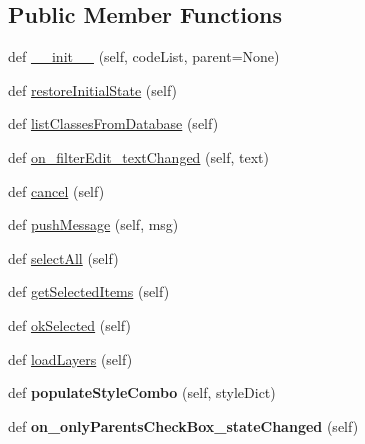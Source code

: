 \subsection*{Public Member Functions}
\begin{DoxyCompactItemize}
\item 
def \mbox{\hyperlink{class_dsg_tools_1_1_layer_tools_1_1load__by__class_1_1_load_by_class_ab9a30d1e698158414c0fd302f1db3ab7}{\+\_\+\+\_\+init\+\_\+\+\_\+}} (self, code\+List, parent=None)
\item 
def \mbox{\hyperlink{class_dsg_tools_1_1_layer_tools_1_1load__by__class_1_1_load_by_class_a2d4794f6c8dae759b5818bede495cc20}{restore\+Initial\+State}} (self)
\item 
def \mbox{\hyperlink{class_dsg_tools_1_1_layer_tools_1_1load__by__class_1_1_load_by_class_a1efa7341ff7e4a8cc6aa15d8e1ef9d9f}{list\+Classes\+From\+Database}} (self)
\item 
def \mbox{\hyperlink{class_dsg_tools_1_1_layer_tools_1_1load__by__class_1_1_load_by_class_a9668940bfcdd2e6083191f06e080b3fd}{on\+\_\+filter\+Edit\+\_\+text\+Changed}} (self, text)
\item 
def \mbox{\hyperlink{class_dsg_tools_1_1_layer_tools_1_1load__by__class_1_1_load_by_class_a9648d37e3fa7311e4cb454089d3b768a}{cancel}} (self)
\item 
def \mbox{\hyperlink{class_dsg_tools_1_1_layer_tools_1_1load__by__class_1_1_load_by_class_ab876bb3ea266ff3dfbedc5d4109c5d39}{push\+Message}} (self, msg)
\item 
def \mbox{\hyperlink{class_dsg_tools_1_1_layer_tools_1_1load__by__class_1_1_load_by_class_a6d48fb9212088fb024f0de2b056f50c7}{select\+All}} (self)
\item 
def \mbox{\hyperlink{class_dsg_tools_1_1_layer_tools_1_1load__by__class_1_1_load_by_class_ad0fcaa51e682f1cf9fbbef4f1e2ac8e3}{get\+Selected\+Items}} (self)
\item 
def \mbox{\hyperlink{class_dsg_tools_1_1_layer_tools_1_1load__by__class_1_1_load_by_class_adc722a26fb632875f143b4dbf6544d36}{ok\+Selected}} (self)
\item 
def \mbox{\hyperlink{class_dsg_tools_1_1_layer_tools_1_1load__by__class_1_1_load_by_class_a1b632f61531a5ba993286a11b1b99345}{load\+Layers}} (self)
\item 
\mbox{\label{class_dsg_tools_1_1_layer_tools_1_1load__by__class_1_1_load_by_class_a875ea5636754b1428f478d8685c5794b}} 
def {\bfseries populate\+Style\+Combo} (self, style\+Dict)
\item 
\mbox{\label{class_dsg_tools_1_1_layer_tools_1_1load__by__class_1_1_load_by_class_ac13ff39df81363673e11bfd84a81ec31}} 
def {\bfseries on\+\_\+only\+Parents\+Check\+Box\+\_\+state\+Changed} (self)
\end{DoxyCompactItemize}

